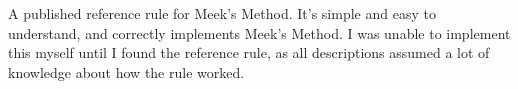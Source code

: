 A published reference rule for Meek's Method.  It's simple and easy to understand, and correctly implements Meek's Method.  I was unable to implement this myself until I found the reference rule, as all descriptions assumed a lot of knowledge about how the rule worked.

